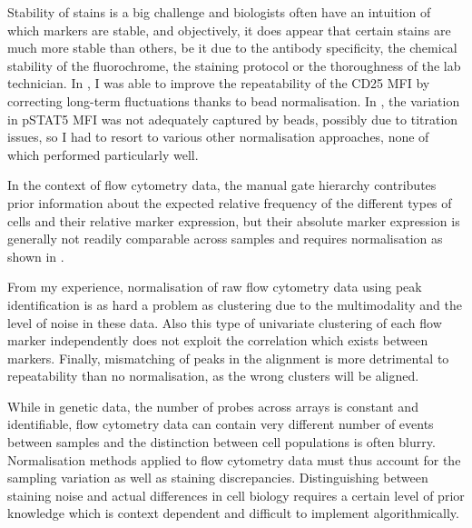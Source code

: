 Stability of stains is a big challenge and biologists often have an intuition of which markers are stable, and objectively, it does appear that certain stains are much more stable than others, be it due to the antibody specificity, the chemical stability of the fluorochrome, the staining protocol or the thoroughness of the lab technician.
In , I was able to improve the repeatability of the CD25 MFI by correcting long-term fluctuations thanks to bead normalisation.
In , the variation in pSTAT5 MFI was not adequately captured by beads, possibly due to titration issues, so I had to resort to various other normalisation approaches, none of which performed particularly well.



In the context of flow cytometry data, the manual gate hierarchy contributes prior information about the expected relative frequency of the different types of cells and their relative marker expression, but their absolute marker expression is generally not readily comparable across samples and requires normalisation as shown in .

From my experience, normalisation of raw flow cytometry data using peak identification is as hard a problem as clustering due to the multimodality and the level of noise in these data.
Also this type of univariate clustering of each flow marker independently does not exploit the correlation which exists between markers.
Finally, mismatching of peaks in the alignment is more detrimental to repeatability than no normalisation, as the wrong clusters will be aligned.

While in genetic data, the number of probes across arrays is constant and identifiable, flow cytometry data can contain very different number of events between samples and the distinction between cell populations is often blurry.
Normalisation methods applied to flow cytometry data must thus account for the sampling variation as well as staining discrepancies.
Distinguishing between staining noise and actual differences in cell biology requires a certain level of prior knowledge which is context dependent and difficult to implement algorithmically.

